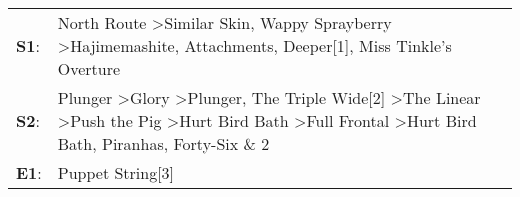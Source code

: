 \begin{supertabular}{p{0.03\textwidth}p{0.92\textwidth}}
 \textbf{S1}:  &                                                                                                                                                                                                             North Route\textsuperscript{} \textgreater \enspace Similar Skin\textsuperscript{}, \enspace Wappy Sprayberry\textsuperscript{} \textgreater \enspace Hajimemashite\textsuperscript{}, \enspace Attachments\textsuperscript{}, \enspace Deeper[1]\textsuperscript{}, \enspace Miss Tinkle's Overture\textsuperscript{}  \enspace  \\
 \textbf{S2}:  &  Plunger\textsuperscript{} \textgreater \enspace Glory\textsuperscript{} \textgreater \enspace Plunger\textsuperscript{}, \enspace The Triple Wide[2]\textsuperscript{} \textgreater \enspace The Linear\textsuperscript{} \textgreater \enspace Push the Pig\textsuperscript{} \textgreater \enspace Hurt Bird Bath\textsuperscript{} \textgreater \enspace Full Frontal\textsuperscript{} \textgreater \enspace Hurt Bird Bath\textsuperscript{}, \enspace Piranhas\textsuperscript{}, \enspace Forty-Six \& 2\textsuperscript{}  \enspace  \\
 \textbf{E1}:  &                                                                                                                                                                                                                                                                                                                                                                                                                                                                                                 Puppet String[3]\textsuperscript{}  \enspace  \\
\end{supertabular}
